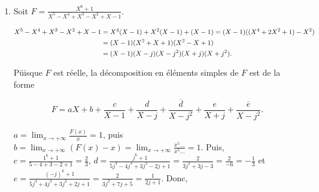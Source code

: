 {{\begin{enumerate}
Mais alors, 

\begin{align*}\ensuremath
d&=\lim_{x\rightarrow i}(x-i)^3F(x)=\lim_{x\rightarrow i}(x-i)^3(F(x)-\frac{1}{16}(\frac{1}{x-1}+\frac{1}{x+1}))\\
 &=-\frac{1}{8}\frac{i^4+4i^2+7}{(i+i)^3}=-\frac{i}{16}
\end{align*}

Puis,

\begin{align*}\ensuremath
-\frac{1}{8}\frac{X^4+4X^2+7}{(X^2+1)^3}+\frac{i}{16}\frac{1}{(X-i)^3}-\frac{i}{16}\frac{1}{(X+i)^3}=
-\frac{1}{8}\frac{X^4+4X^2+7}{(X^2+1)^3}+\frac{1}{8}\frac{3X^2-1}{(X^2+1)^3}=\frac{X^2+6}{8(X^2+1)^2}.
\end{align*}

Ensuite, $c=\frac{i^2+6}{8(i+i)^2}=-\frac{5}{32}$. Puis,

$$\frac{X^2+6}{8(X^2+1)^2}+\frac{5}{32}(\frac{1}{(X-i)^2}+\frac{1}{(X+i)^2})
=\frac{2(X^2+6)+5(X^2-1)}{16(X^2+1)^2}=\frac{7}{16(X^2+1)}.$$

Enfin, $b=\frac{7}{16(i+i)}=-\frac{7i}{32}$. Finalement,

$$F=\frac{1}{16}(\frac{1}{X-1}+\frac{1}{X+1})-\frac{7i}{32}(\frac{1}{X-i}-\frac{1}{X+i})-\frac{5}{32}(\frac{1}{(X-i)^2}+\frac{1}{(X+i)^2})-\frac{i}{16}(\frac{1}{(X-i)^3}-\frac{1}{(X+i)^3}).$$

\item  Soit $F=\frac{X^6+1}{X^5-X^4+X^3-X^2+X-1}$.

\begin{align*}\ensuremath
X^5-X^4+X^3-X^2+X-1&=X^4(X-1)+X^2(X-1)+(X-1)=(X-1)((X^4+2X^2+1)-X^2)\\
 &=(X-1)(X^2+X+1)(X^2-X+1)\\
 &=(X-1)(X-j)(X-j^2)(X+j)(X+j^2).
\end{align*}

Püisque $F$ est réelle, la décomposition en éléments simples de $F$ est de la forme

$$F=aX+b+\frac{c}{X-1}+\frac{d}{X-j}+\frac{\overline{d}}{X-j^2}+\frac{e}{X+j}+\frac{\overline{e}}{X-j^2}.$$

$a=\lim_{x\rightarrow +\infty}\frac{F(x)}{x}=1$, puis $b=\lim_{x\rightarrow +\infty}(F(x)-x)=\lim_{x\rightarrow +\infty}\frac{x^5...}{x^5...}=1$. Puis, $c=\frac{1^6+1}{5-4+3-2+1}=\frac{2}{3}$,
$d=\frac{j^6+1}{5j^4-4j^3+3j^2-2j+1}=\frac{2}{3j^2+3j-3}=\frac{2}{-6}=-\frac{1}{3}$ et $e=\frac{(-j)^6+1}{5j^4+4j^3+3j^2+2j+1}=\frac{2}{3j^2+7j+5}=\frac{1}{2j+1}$. Donc,


\end{enumerate}}}
